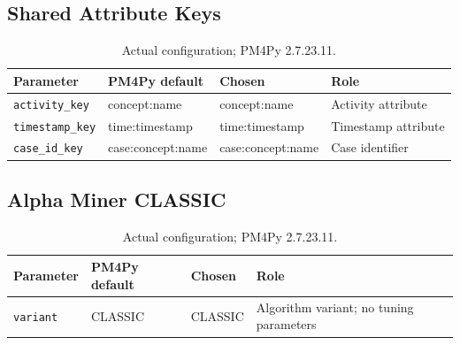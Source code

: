 \clearpage
\subsection{Shared Attribute Keys}
\begin{table}[h!]
\centering
\small
\begin{tabular}{p{}p{}p{}p{}}
\hline
Parameter & PM4Py default & Chosen & Role \\
\hline
\texttt{activity\_\allowbreak{}key} & concept:\allowbreak{}name & concept:\allowbreak{}name & Activity attribute \\
\texttt{timestamp\_\allowbreak{}key} & time:\allowbreak{}timestamp & time:\allowbreak{}timestamp & Timestamp attribute \\
\texttt{case\_\allowbreak{}id\_\allowbreak{}key} & case:\allowbreak{}concept:\allowbreak{}name & case:\allowbreak{}concept:\allowbreak{}name & Case identifier \\
\hline
\end{tabular}
\caption{Actual configuration; PM4Py 2.7.23.11.}
\end{table}
\clearpage
\subsection{Alpha Miner CLASSIC}
\begin{table}[h!]
\centering
\small
\begin{tabular}{p{}p{}p{}p{}}
\hline
Parameter & PM4Py default & Chosen & Role \\
\hline
\texttt{variant} & CLASSIC & CLASSIC & Algorithm variant; no tuning parameters \\
\hline
\end{tabular}
\caption{Actual configuration; PM4Py 2.7.23.11.}
\end{table}
\clearpage
